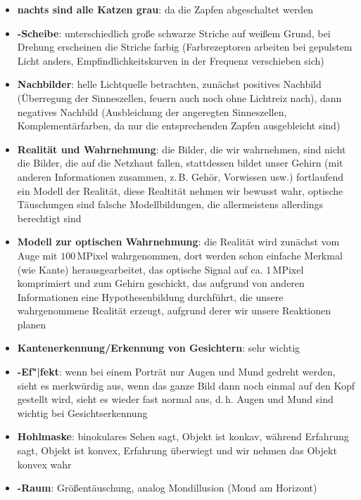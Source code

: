 \linie
\begin{itemize}
    \item
    \textbf{nachts sind alle Katzen grau}:
    da die Zapfen abgeschaltet werden

    \item
    \textbf{-Scheibe}:
    unterschiedlich große schwarze Striche auf weißem Grund, bei Drehung
    erscheinen die Striche farbig (Farbrezeptoren arbeiten bei gepulstem Licht
    anders, Empfindlichkeitskurven in der Frequenz verschieben sich)

    \item
    \textbf{Nachbilder}:
    helle Lichtquelle betrachten,
    zunächst positives Nachbild (Überregung der Sinneszellen, feuern auch noch
    ohne Lichtreiz nach), dann negatives Nachbild
    (Ausbleichung der angeregten Sinneszellen, Komplementärfarben, da nur
    die entsprechenden Zapfen ausgebleicht sind)
\end{itemize}
\linie
\begin{itemize}
    \item
    \textbf{Realität und Wahrnehmung}:
    die Bilder, die wir wahrnehmen, sind nicht die Bilder, die auf die
    Netzhaut fallen, stattdessen bildet unser Gehirn (mit anderen Informationen
    zusammen, z.\,B. Gehör, Vorwissen usw.) fortlaufend ein Modell der
    Realität, diese Realtität nehmen wir bewusst wahr,
    optische Täuschungen sind falsche Modellbildungen,
    die allermeistens allerdings berechtigt sind

    \item
    \textbf{Modell zur optischen Wahrnehmung}:
    die Realität wird zunächst vom Auge mit $100\,\text{MPixel}$ wahrgenommen,
    dort werden schon einfache Merkmal (wie Kante) herausgearbeitet,
    das optische Signal auf ca. $1\,\text{MPixel}$ komprimiert und zum
    Gehirn geschickt, das aufgrund von anderen Informationen eine
    Hypothesenbildung durchführt, die unsere wahrgenommene Realität
    erzeugt, aufgrund derer wir unsere Reaktionen planen

    \item
    \textbf{Kantenerkennung/Erkennung von Gesichtern}:
    sehr wichtig

    \item
    \textbf{-Ef"|fekt}:
    wenn bei einem Porträt nur Augen und Mund gedreht werden,
    sieht es merkwürdig aus, wenn das ganze Bild dann noch einmal
    auf den Kopf gestellt wird, sieht es wieder fast normal aus,
    d.\,h. Augen und Mund sind wichtig bei Gesichtserkennung

    \item
    \textbf{Hohlmaske}:
    binokulares Sehen sagt, Objekt ist konkav,
    während Erfahrung sagt, Objekt ist konvex,
    Erfahrung überwiegt und wir nehmen das Objekt konvex wahr

    \item
    \textbf{-Raum}:
    Größentäuschung, analog Mondillusion (Mond am Horizont)
\end{itemize}
